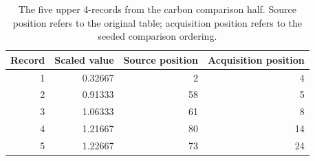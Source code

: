 \begin{table}[htbp]
\centering
\caption{The five upper 4-records from the carbon comparison half. Source position refers to the original table; acquisition position refers to the seeded comparison ordering.}\label{tab:carbon-records}
\small
\begin{tabular}{rrrr}
\toprule
Record & Scaled value & Source position & Acquisition position \\
\midrule
1 & 0.32667 & 2 & 4 \\
2 & 0.91333 & 58 & 5 \\
3 & 1.06333 & 61 & 8 \\
4 & 1.21667 & 80 & 14 \\
5 & 1.22667 & 73 & 24 \\
\bottomrule
\end{tabular}
\end{table}
